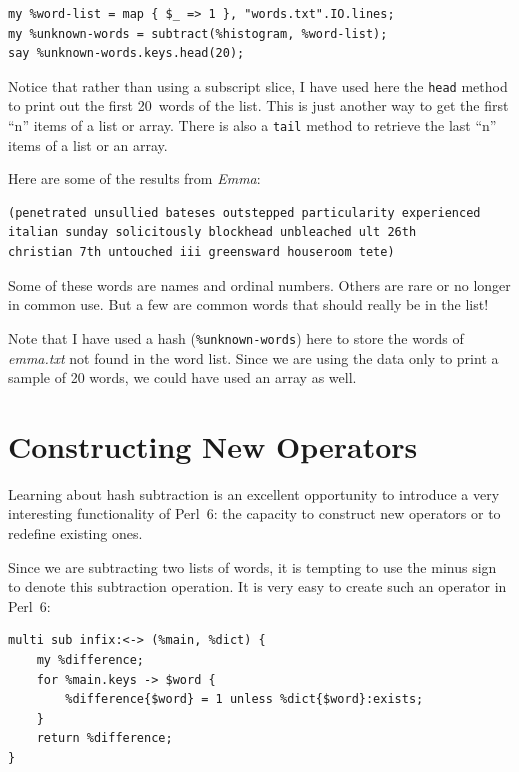 \begin{verbatim}
my %word-list = map { $_ => 1 }, "words.txt".IO.lines;
my %unknown-words = subtract(%histogram, %word-list);
say %unknown-words.keys.head(20);
\end{verbatim}
%
Notice that rather than using a subscript slice, I have used 
here the {\tt head} method to print out the first 20~words of 
the list. This is just another way to get the first ``n'' items 
of a list or array. There is also a {\tt tail} method to 
retrieve the last ``n'' items of a list or an array.

Here are some of the results from {\em Emma}:

\begin{verbatim}
(penetrated unsullied bateses outstepped particularity experienced 
italian sunday solicitously blockhead unbleached ult 26th 
christian 7th untouched iii greensward houseroom tete)
\end{verbatim}
%
Some of these words are names and ordinal numbers.  Others 
are rare or no longer in common use.  But a few are common
words that should really be in the list!

Note that I have used a hash (\verb'%unknown-words') here to 
store the words of \emph{emma.txt} not found in the word list. 
Since we are using the data only to print a sample of 20 words, 
we could have used an array as well.

\section{Constructing New Operators}

\label{operator_construction}

Learning about hash subtraction is an excellent 
opportunity to introduce a very interesting functionality of 
Perl~6: the capacity to construct new operators or to 
redefine existing ones.

Since we are subtracting two lists of words, it is tempting to 
use the minus sign to denote this subtraction operation. It  
is very easy to create such an operator in Perl~6:

\begin{verbatim}
multi sub infix:<-> (%main, %dict) {
	my %difference;
	for %main.keys -> $word {
		%difference{$word} = 1 unless %dict{$word}:exists;
	}
	return %difference;
}
\end{verbatim}

